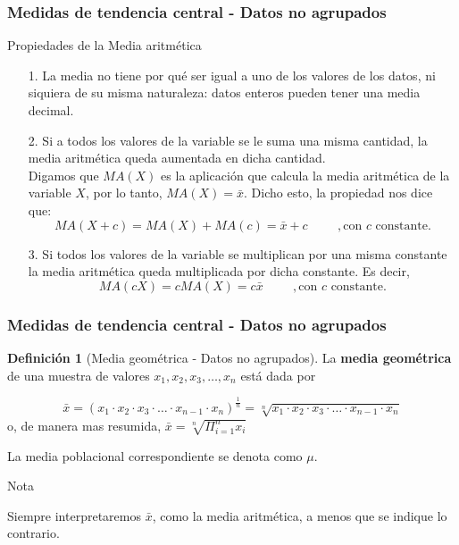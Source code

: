 \documentclass[10pt]{beamer}
\theoremstyle{plain} %
\theoremstyle{definition}
\newtheorem{defn}{Definición}
\theoremstyle{remark}
\begin{document}
\begin{frame}
\frametitle{Medidas de tendencia central - Datos no agrupados}
\begin{alertblock}{Propiedades de la Media aritmética}
\begin{itemize}[<+->]
\item[1.] La media no tiene por qué ser igual a uno de los valores de los datos, ni siquiera de su misma naturaleza: datos enteros pueden tener una media decimal.
\item[2.] Si a todos los valores de la variable se le suma una misma cantidad, la media  aritmética queda aumentada en dicha cantidad.\\
Digamos que $MA(X)$ es la aplicación que calcula la media aritmética de la variable $X$, por lo tanto, $MA(X)=\bar{x}$. Dicho esto, la propiedad nos dice que:
$$MA(X+c)=MA(X)+MA(c)=\bar{x}+c \hspace{1cm}, \text{con $c$ constante.}$$
\item[3.] Si todos los valores de la variable se multiplican por una misma constante la media aritmética queda multiplicada por dicha constante. Es decir, 
$$MA(cX)=cMA(X)=c\bar{x} \hspace{1cm}, \text{con $c$ constante.}$$

\end{itemize}

\end{alertblock}
\end{frame}








\begin{frame}
\frametitle{Medidas de tendencia central - Datos no agrupados}
\begin{defn}[Media geométrica - Datos no agrupados]
La \textbf{media geométrica} de una muestra de valores $x_1, x_2, x_3, \ldots, x_n$ está dada por

$$\bar{x}=(x_1\cdot x_2\cdot x_3\cdot \ldots\cdot x_{n-1}\cdot x_n)^{\frac{1}{n}}=\sqrt[n]{x_1\cdot x_2\cdot x_3\cdot \ldots\cdot x_{n-1}\cdot x_n}$$
o, de manera mas resumida, $\bar{x}=\sqrt[n]{\Pi_{i=1}^{n} x_i}$

La media poblacional correspondiente se denota como $\mu$.
\end{defn}

\begin{alertblock}{Nota}

Siempre interpretaremos $\bar{x}$, como la media aritmética, a menos que se indique lo contrario.
\end{alertblock}

\end{frame}
\end{document}
